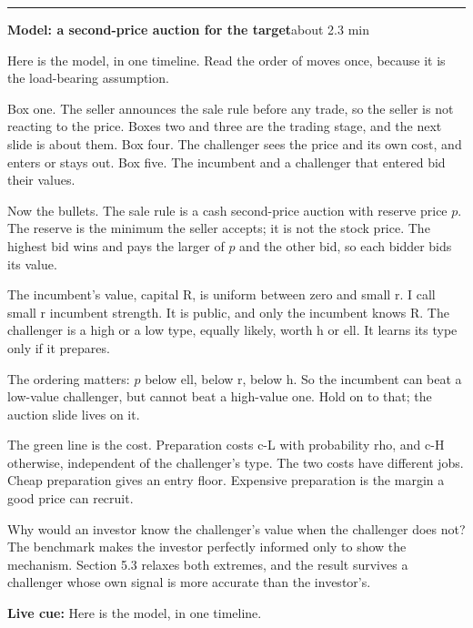 \documentclass[11pt]{article}
\newcommand{\Cue}[1]{\par\nobreak\smallskip\noindent
  \textcolor{ScriptGray}{\footnotesize\textbf{Live cue:} #1}\par}
\newcommand{\scriptframe}[3]{%
  \Needspace{9\baselineskip}%
  \par\medskip\noindent\textcolor{ScriptBlue}{\rule{\linewidth}{0.55pt}}%
  \par\smallskip\noindent
  \textbf{#1}\hfill\textcolor{ScriptGray}{\small #2}\par\smallskip
  #3\par}
\begin{document}
\scriptframe{Model: a second-price auction for the target}{about 2.3 min}{%
  Here is the model, in one timeline. Read the order of moves once, because it
  is the load-bearing assumption.

  Box one. The seller announces the sale rule before any trade, so the seller
  is not reacting to the price. Boxes two and three are the trading stage, and
  the next slide is about them. Box four. The challenger sees the price and its
  own cost, and enters or stays out. Box five. The incumbent and a challenger
  that entered bid their values.

  Now the bullets. The sale rule is a cash second-price auction with reserve
  price $p$. The reserve is the minimum the seller accepts; it is not the stock
  price. The highest bid wins and pays the larger of $p$ and the other bid, so
  each bidder bids its value.

  The incumbent's value, capital R, is uniform between zero and small r. I call
  small r incumbent strength. It is public, and only the incumbent knows R. The
  challenger is a high or a low type, equally likely, worth h or ell. It learns
  its type only if it prepares.

  The ordering matters: $p$ below ell, below r, below h. So the incumbent can
  beat a low-value challenger, but cannot beat a high-value one. Hold on to
  that; the auction slide lives on it.

  The green line is the cost. Preparation costs c-L with probability rho, and
  c-H otherwise, independent of the challenger's type. The two costs have
  different jobs. Cheap preparation gives an entry floor. Expensive preparation
  is the margin a good price can recruit.

  Why would an investor know the challenger's value when the challenger does
  not? The benchmark makes the investor perfectly informed only to show the
  mechanism. Section 5.3 relaxes both extremes, and the result survives a
  challenger whose own signal is more accurate than the investor's.
  \Cue{Here is the model, in one timeline.}
}
\end{document}
